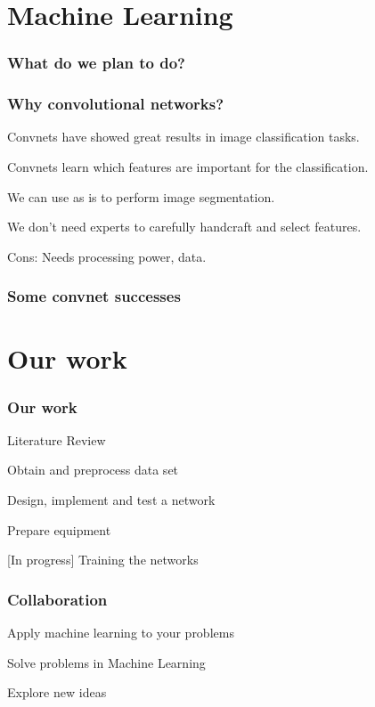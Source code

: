 \documentclass[12pt]{beamer}
\begin{document}
	

	\section{Machine Learning}
	\begin{frame}
		\frametitle{What do we plan to do?}
	\end{frame}
	
	\begin{frame}
		\frametitle{Why convolutional networks?}
		Convnets have showed great results in image classification tasks.
		
		Convnets learn which features are important for the classification.
		
		We can use as is to perform image segmentation.

		We don’t need experts to carefully handcraft and select features.


		Cons: Needs processing power, data.
	\end{frame}
	
	\begin{frame}
		\frametitle{Some convnet successes}
	\end{frame}	
	
	\section{Our work}
	\begin{frame}
		\frametitle{Our work}
		Literature Review

		Obtain and preprocess data set
		
		Design, implement and test a network
		
		Prepare equipment
	
		[In progress] Training the networks
	\end{frame}
	
	\begin{frame}
		\frametitle{Collaboration}
		Apply machine learning to your problems
		
		Solve problems in Machine Learning
		
		Explore new ideas
	\end{frame}
	
\end{document}
